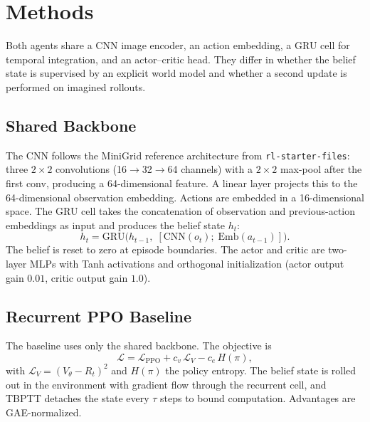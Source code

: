 \documentclass[letterpaper]{article}
\begin{document}
\section{Methods}

Both agents share a CNN image encoder, an action embedding, a GRU cell for
temporal integration, and an actor--critic head. They differ in whether
the belief state is supervised by an explicit world model and whether a
second update is performed on imagined rollouts.

\subsection{Shared Backbone}

The CNN follows the MiniGrid reference architecture from
\texttt{rl-starter-files}: three $2\times 2$ convolutions (16$\to$32$\to$64
channels) with a $2\times 2$ max-pool after the first conv, producing a
64-dimensional feature. A linear layer projects this to the 64-dimensional
observation embedding. Actions are embedded in a 16-dimensional space. The
GRU cell takes the concatenation of observation and previous-action
embeddings as input and produces the belief state $h_t$:
\begin{equation}
    h_t = \mathrm{GRU}\big(h_{t-1},\;[\text{CNN}(o_t);\; \text{Emb}(a_{t-1})]\big).
\end{equation}
The belief is reset to zero at episode boundaries. The actor and critic
are two-layer MLPs with Tanh activations and orthogonal initialization
(actor output gain $0.01$, critic output gain $1.0$).

\subsection{Recurrent PPO Baseline}

The baseline uses only the shared backbone. The objective is
\begin{equation}
    \mathcal{L} = \mathcal{L}_{\text{PPO}}
                  + c_v\,\mathcal{L}_V
                  - c_e\,H(\pi),
\end{equation}
with $\mathcal{L}_V = (V_\theta - R_t)^2$ and $H(\pi)$ the policy entropy.
The belief state is rolled out in the environment with gradient flow
through the recurrent cell, and TBPTT detaches the state every $\tau$ steps
to bound computation. Advantages are GAE-normalized.
\end{document}
